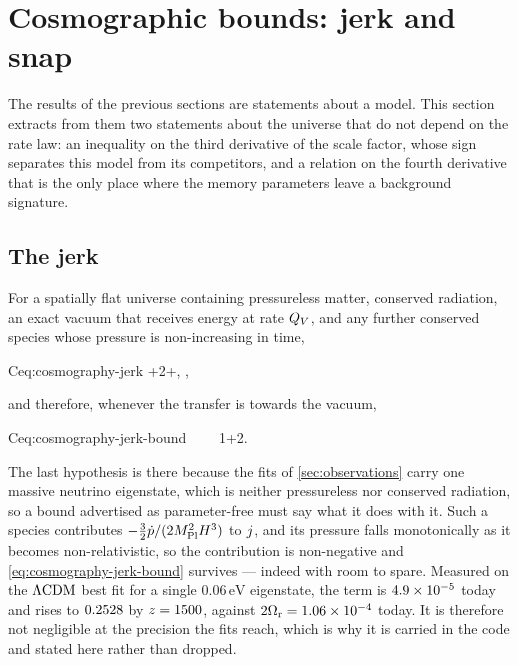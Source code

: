\section{Cosmographic bounds: jerk and snap}\label{sec:cosmography}

The results of the previous sections are statements about a model. This section
extracts from them two statements about the universe that do not depend on the
rate law: an inequality on the third derivative of the scale factor, whose sign
separates this model from its competitors, and a relation on the fourth
derivative that is the only place where the memory parameters leave a
background signature.

\subsection{The jerk}\label{sec:cosmography-jerk}

\begin{theorem}\label{thm:jerk}
  For a spatially flat universe containing pressureless matter, conserved
  radiation, an exact vacuum that receives energy at rate $Q_{V}$, and any
  further conserved species whose pressure is non-increasing in time,
  \begin{keyresult}{C}{eq:cosmography-jerk}
    +2\Omr+\varepsilon ,
    \qquad
    \varepsilon\eqdef{} ,
  \end{keyresult}
  and therefore, whenever the transfer is towards the vacuum,
  \begin{keyresult}{C}{eq:cosmography-jerk-bound}
    \QV{}\ \Longrightarrow\ \jerk\ \ge\ 1+2\Omr .
  \end{keyresult}
\end{theorem}

\begin{remark}\label{rem:jerk-neutrinos}
  The last hypothesis is there because the fits of \cref{sec:observations}
  carry one massive neutrino eigenstate, which is neither pressureless nor
  conserved radiation, so a bound advertised as parameter-free must say what it
  does with it. Such a species contributes $-\tfrac32\dot p/(2M_{\mathrm{Pl}}^2H^3)$ to
  $j$, and its pressure falls monotonically as it becomes non-relativistic,
  so the contribution is non-negative and
  \cref{eq:cosmography-jerk-bound} survives --- indeed with room to spare.
  Measured on the $\Lambda\mathrm{CDM}$ best fit for a single $0.06\,\si{\electronvolt}$
  eigenstate, the term is $\num{4.9e-05}$ today and rises to
  $0.2528$ by $z=1500$,
  against $2\Omega_{\mathrm{r}}=\num{1.06e-04}$ today. It is therefore not
  negligible at the precision the fits reach, which is why it is carried in the
  code and stated here rather than dropped.
\end{remark}


